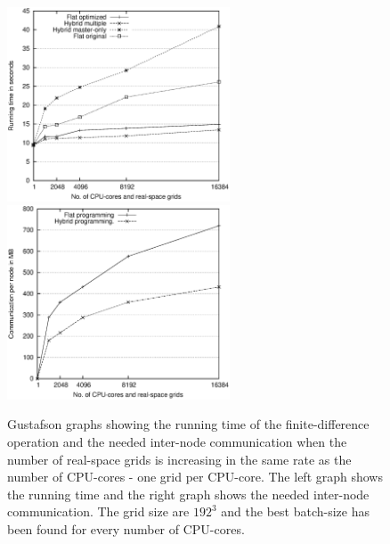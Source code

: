 \documentclass[conference]{IEEEtran}
\begin{document}
\begin{figure}
\centerline{
\mbox{\includegraphics[width=250px]{gfx/fidi_gustavson}}
\mbox{\includegraphics[width=250px]{gfx/fidi_gustavson_comm}}
} 
 \caption{Gustafson graphs showing the running time of the finite-difference operation and the needed inter-node communication when the number of real-space grids is increasing in the same rate as the number of CPU-cores - one grid per CPU-core. The left graph shows the running time and the right graph shows the needed inter-node communication. The grid size are $192^3$ and the best batch-size has been found for every number of CPU-cores. }
 \label{fig:gustafson}
\end{figure}
\end{document}
